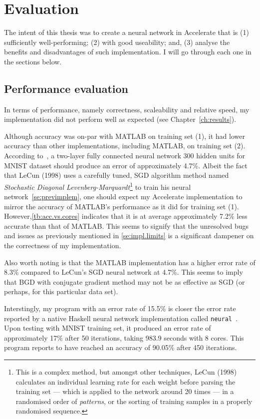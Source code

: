 \chapter{Evaluation}\label{ch:eval}

The intent of this thesis was to create a neural network in Accelerate that is (1) sufficiently well-performing; (2) with good useability; and, (3) analyse the benefits and disadvantages of such implementation. I will go through each one in the sections below.

\section{Performance evaluation} \label{se:eval.performance}

In terms of performance, namely correctness, scaleability and relative speed, my implementation did not perform well as expected (see Chapter~\ref{ch:results}).

Although accuracy was on-par with MATLAB on training set (1), it had lower accuracy than other implementations, including MATLAB, on training set (2). According to~\cite{LeC98}, a two-layer fully connected neural network 300 hidden units for MNIST dataset should produce an error of approximately 4.7\%. Albeit the fact that LeCun (1998) uses a carefully tuned, SGD algorithm method named \textit{Stochastic Diagonal Levenberg-Marquardt}\footnote{This is a complex method, but amongst other techniques, LeCun (1998) calculates an individual learning rate for each weight before parsing the training set --- which is applied to the network around 20 times --- in a randomised order of \textit{patterns}, or the sorting of training samples in a properly randomised sequence.} to train his neural network~\ref{se:previmplem}, one should expect my Accelerate implementation to mirror the accuracy of MATLAB's performance as it did for training set (1). However,\ref{tb:acc.vs.cores} indicates that it is at average approximately 7.2\% less accurate than that of MATLAB. This seems to signify that the unresolved bugs and issues as previously mentioned in \ref{se:impl.limits} is a significant dampener on the correctness of my implementation.

Also worth noting is that the MATLAB implementation has a higher error rate of 8.3\% compared to LeCun's SGD neural network at 4.7\%. This seems to imply that BGD with conjugate gradient method may not be as effective as SGD (or perhaps, for this particular data set). 

Interstingly, my program with an error rate of 15.5\% is closer the error rate reported by a native Haskell neural network implementation called \texttt{neural}~\cite{Bru16}. Upon testing with MNIST training set, it produced an error rate of approximately 17\% after 50 iterations, taking 983.9 seconds with 8 cores. This program reports to have reached an accuracy of 90.05\% after 450 iterations. 

